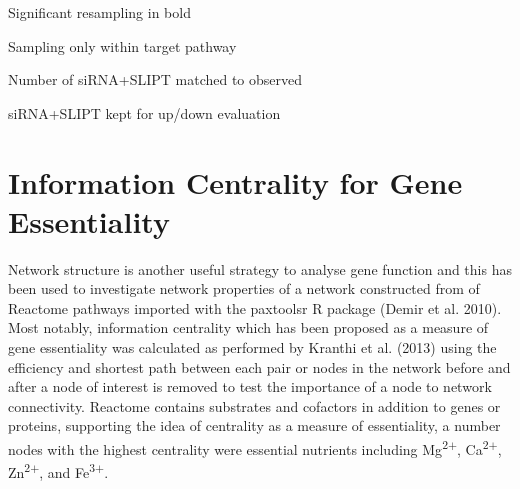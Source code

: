 \begin{table*}[!htb]
{{\begin{threeparttable}
\begin{tablenotes}
Significant resampling in bold

Sampling only within target pathway

Number of siRNA+SLIPT matched to observed

siRNA+SLIPT kept for up/down evaluation 
\end{tablenotes}
\end{threeparttable}
}
}
\end{table*}


\FloatBarrier

\chapter{Information Centrality for Gene Essentiality}
\label{appendix:infocent_essential}

\FloatBarrier


Network structure is another useful strategy to analyse gene function and this has been used to investigate network properties of a network constructed from of Reactome pathways imported with the paxtoolsr R package (Demir et al. 2010). Most notably, information centrality which has been proposed as a measure of gene essentiality was calculated as performed by Kranthi et al. (2013) using the efficiency and shortest path between each pair or nodes in the network before and after a node of interest is removed to test the importance of a node to network connectivity. Reactome contains substrates and cofactors in addition to genes or proteins, supporting the idea of centrality as a measure of essentiality, a number nodes with the highest centrality were essential nutrients including Mg\textsuperscript{2$+$}, Ca\textsuperscript{2$+$}, Zn\textsuperscript{2$+$},  and Fe\textsuperscript{3$+$}.


